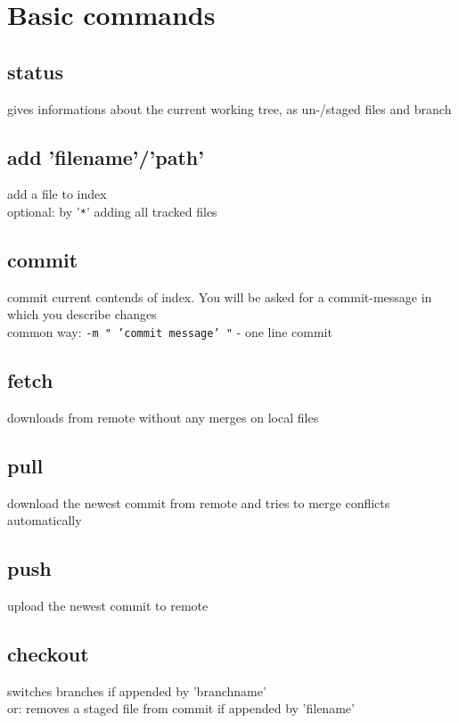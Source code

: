 \section*{Basic commands}

\subsection*{status}
gives informations about the current working tree, as un-/staged files and branch\\

\subsection*{add 'filename'/'path'}
add a file to index\\
optional: by '\texttt{*}' adding all tracked files\\

\subsection*{commit}
commit current contends of index. You will be asked for a commit-message in which you describe changes\\
common way: \texttt{-m "\ 'commit message' "} - one line commit\\

\subsection*{fetch}
downloads from remote without any merges on local files\\

\subsection*{pull}
download the newest commit from remote and tries to merge conflicts automatically \\

\subsection*{push}
upload the newest commit to remote\\

\subsection*{checkout}
switches branches if appended by 'branchname'\\
or: removes a staged file from commit if appended by 'filename'\\

